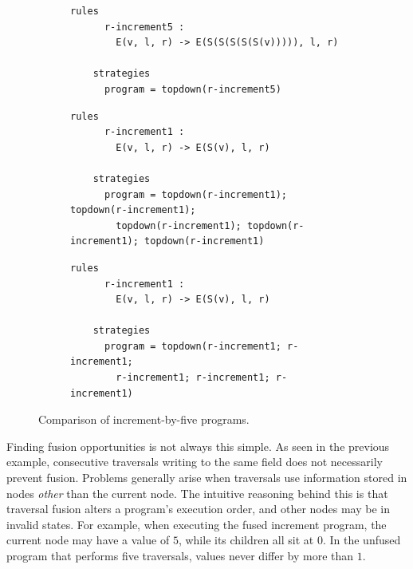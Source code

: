 \begin{figure}

\begin{subfigure}{\textwidth}
\begin{lstlisting}[style = mystyle_increment_comparison]
    rules
      r-increment5 :
        E(v, l, r) -> E(S(S(S(S(S(v))))), l, r)
    
    strategies
      program = topdown(r-increment5)
\end{lstlisting}
\label{fig:increment-by-five-comparison-1}
\end{subfigure}

\begin{subfigure}{\textwidth}
\begin{lstlisting}[style = mystyle_increment_comparison]
    rules
      r-increment1 :
        E(v, l, r) -> E(S(v), l, r)
    
    strategies
      program = topdown(r-increment1); topdown(r-increment1);
        topdown(r-increment1); topdown(r-increment1); topdown(r-increment1)
\end{lstlisting}
\label{fig:increment-by-five-comparison-2}
\end{subfigure}

\begin{subfigure}{\textwidth}
\begin{lstlisting}[style = mystyle_increment_comparison]
    rules
      r-increment1 :
        E(v, l, r) -> E(S(v), l, r)
    
    strategies
      program = topdown(r-increment1; r-increment1;
        r-increment1; r-increment1; r-increment1)
\end{lstlisting}
\label{fig:increment-by-five-comparison-3}
\end{subfigure}

\caption{Comparison of increment-by-five programs.}
\label{fig:increment-by-five-comparison}
\end{figure}

Finding fusion opportunities is not always this simple. As seen in the previous example, consecutive traversals writing to the same field does not necessarily prevent fusion. Problems generally arise when traversals use information stored in nodes \textit{other} than the current node. The intuitive reasoning behind this is that traversal fusion alters a program's execution order, and other nodes may be in invalid states. For example, when executing the fused increment program, the current node may have a value of $5$, while its children all sit at $0$. In the unfused program that performs five traversals, values never differ by more than $1$.

